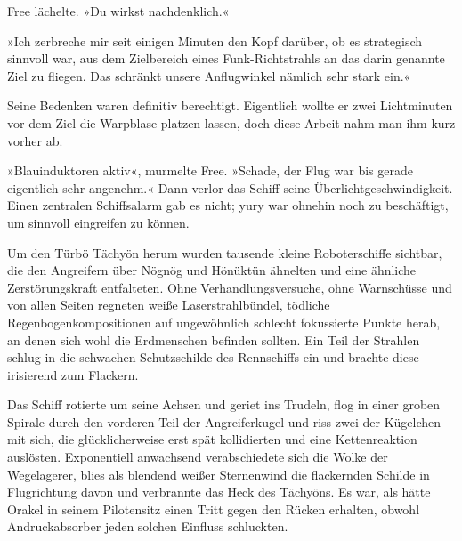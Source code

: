 Free lächelte. »Du wirkst nachdenklich.«

»Ich zerbreche mir seit einigen Minuten den Kopf darüber, ob es strategisch sinnvoll war, aus dem Zielbereich eines Funk-Richtstrahls an das darin genannte Ziel zu fliegen. Das schränkt unsere Anflugwinkel nämlich sehr stark ein.«

Seine Bedenken waren definitiv berechtigt. Eigentlich wollte er zwei Lichtminuten vor dem Ziel die Warpblase platzen lassen, doch diese Arbeit nahm man ihm kurz vorher ab.

»Blauinduktoren aktiv«, murmelte Free. »Schade, der Flug war bis gerade eigentlich sehr angenehm.« Dann verlor das Schiff seine Überlichtgeschwindigkeit. Einen zentralen Schiffsalarm gab es nicht; yury war ohnehin noch zu beschäftigt, um sinnvoll eingreifen zu können.

Um den Türbö Tächyön herum wurden tausende kleine Roboterschiffe sichtbar, die den Angreifern über Nögnög und Hönüktün ähnelten und eine ähnliche Zerstörungskraft entfalteten. Ohne Verhandlungsversuche, ohne Warnschüsse und von allen Seiten regneten weiße Laserstrahlbündel, tödliche Regenbogenkompositionen auf ungewöhnlich schlecht fokussierte Punkte herab, an denen sich wohl die Erdmenschen befinden sollten. Ein Teil der Strahlen schlug in die schwachen Schutzschilde des Rennschiffs ein und brachte diese irisierend zum Flackern.

Das Schiff rotierte um seine Achsen und geriet ins Trudeln, flog in einer groben Spirale durch den vorderen Teil der Angreiferkugel und riss zwei der Kügelchen mit sich, die glücklicherweise erst spät kollidierten und eine Kettenreaktion auslösten. Exponentiell anwachsend verabschiedete sich die Wolke der Wegelagerer, blies als blendend weißer Sternenwind die flackernden Schilde in Flugrichtung davon und verbrannte das Heck des Tächyöns. Es war, als hätte Orakel in seinem Pilotensitz einen Tritt gegen den Rücken erhalten, obwohl Andruckabsorber jeden solchen Einfluss schluckten.

